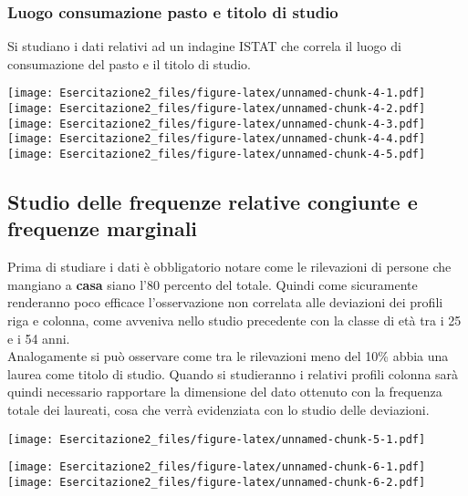 \documentclass[
]{article}
\begin{document}
\hypertarget{luogo-consumazione-pasto-e-titolo-di-studio}{%
\subsubsection{Luogo consumazione pasto e titolo di
studio}\label{luogo-consumazione-pasto-e-titolo-di-studio}}

Si studiano i dati relativi ad un indagine ISTAT che correla il luogo di
consumazione del pasto e il titolo di studio.

\texttt{[image: Esercitazione2\_files/figure-latex/unnamed-chunk-4-1.pdf]}
\texttt{[image: Esercitazione2\_files/figure-latex/unnamed-chunk-4-2.pdf]}
\texttt{[image: Esercitazione2\_files/figure-latex/unnamed-chunk-4-3.pdf]}
\texttt{[image: Esercitazione2\_files/figure-latex/unnamed-chunk-4-4.pdf]}
\texttt{[image: Esercitazione2\_files/figure-latex/unnamed-chunk-4-5.pdf]}

\hypertarget{studio-delle-frequenze-relative-congiunte-e-frequenze-marginali}{%
\subsection{Studio delle frequenze relative congiunte e frequenze
marginali}\label{studio-delle-frequenze-relative-congiunte-e-frequenze-marginali}}

Prima di studiare i dati è obbligatorio notare come le rilevazioni di
persone che mangiano a \textbf{casa} siano l'80 percento del totale.
Quindi come sicuramente renderanno poco efficace l'osservazione non
correlata alle deviazioni dei profili riga e colonna, come avveniva
nello studio precedente con la classe di età tra i 25 e i 54 anni.\\
Analogamente si può osservare come tra le rilevazioni meno del 10\%
abbia una laurea come titolo di studio. Quando si studieranno i relativi
profili colonna sarà quindi necessario rapportare la dimensione del dato
ottenuto con la frequenza totale dei laureati, cosa che verrà
evidenziata con lo studio delle deviazioni.

\texttt{[image: Esercitazione2\_files/figure-latex/unnamed-chunk-5-1.pdf]}

\texttt{[image: Esercitazione2\_files/figure-latex/unnamed-chunk-6-1.pdf]}
\texttt{[image: Esercitazione2\_files/figure-latex/unnamed-chunk-6-2.pdf]}
\end{document}
